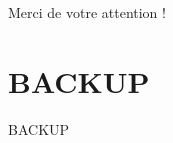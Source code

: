 \documentclass[usenames,dvipsnames]{beamer}
\begin{document}
\begin{frame}
\begin{center}
Merci de votre attention !
\end{center}
\end{frame}

\appendix
\section{BACKUP}
\begin{frame}
\begin{center}
\LARGE
BACKUP
\end{center}
\end{frame}

\begin{frame}
\tableofcontents
\end{frame}










\end{document}
